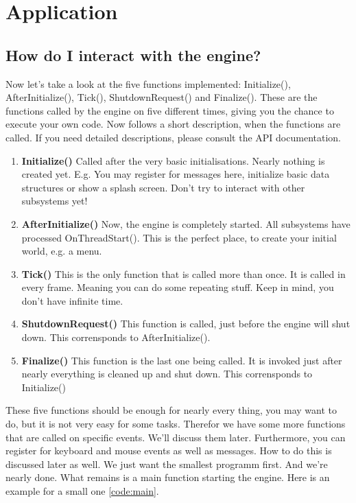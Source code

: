 \documentclass{article}
\begin{document}
\section{Application}

\subsection{How do I interact with the engine?}


Now let's take a look at the five functions implemented: Initialize(), AfterInitialize(), Tick(), ShutdownRequest() and Finalize(). These are the functions called by the engine on five different times, giving you the chance to execute your own code. Now follows a short description, when the functions are called. If you need detailed descriptions, please consult the API documentation.
\begin{enumerate}
	\item \textbf{Initialize()} Called after the very basic initialisations. Nearly nothing is created yet. E.g. You may register for messages here, initialize basic data structures or show a splash screen. Don't try to interact with other subsystems yet!
	\item \textbf{AfterInitialize()} Now, the engine is completely started. All subsystems have processed OnThreadStart(). This is the perfect place, to create your initial world, e.g. a menu.
	\item \textbf{Tick()} This is the only function that is called more than once. It is called in every frame. Meaning you can do some repeating stuff. Keep in mind, you don't have infinite time.
	\item \textbf{ShutdownRequest()} This function is called, just before the engine will shut down. This corrensponds to AfterInitialize().
	\item \textbf{Finalize()} This function is the last one being called. It is invoked just after nearly everything is cleaned up and shut down. This corrensponds to Initialize()
\end{enumerate}
These five functions should be enough for nearly every thing, you may want to do, but it is not very easy for some tasks. Therefor we have some more functions that are called on specific events. We'll discuss them later. Furthermore, you can register for keyboard and mouse events as well as messages. How to do this is discussed later as well. We just want the smallest programm first. And we're nearly done. What remains is a main function starting the engine. Here is an example for a small one \ref{code:main}.
\end{document}
